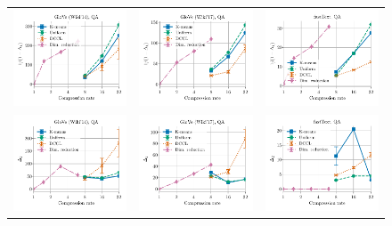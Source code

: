 \begin{figure}
\begin{tabular}{@{\hskip -0.0in}c@{\hskip -0.0in}c@{\hskip -0.0in}c@{\hskip -0.0in}}
		\includegraphics[width=.245\linewidth]{figures/glove400k_synthetics-large-dim_gram-large-dim-delta1-2-trans_vs_compression_linx_stoc.pdf} &
		\includegraphics[width=.245\linewidth]{figures/glove-wiki400k-am_synthetics-large-dim_gram-large-dim-delta1-2-trans_vs_compression_linx_stoc.pdf} &
		\includegraphics[width=.245\linewidth]{figures/fasttext1m_synthetics-large-dim_gram-large-dim-delta1-2-trans_vs_compression_linx_stoc.pdf}	\\
		\includegraphics[width=.245\linewidth]{figures/glove400k_synthetics-large-dim_gram-large-dim-delta2-2_vs_compression_linx_stoc.pdf} &
		\includegraphics[width=.245\linewidth]{figures/glove-wiki400k-am_synthetics-large-dim_gram-large-dim-delta2-2_vs_compression_linx_stoc.pdf} &
		\includegraphics[width=.245\linewidth]{figures/fasttext1m_synthetics-large-dim_gram-large-dim-delta2-2_vs_compression_linx_stoc.pdf}	\\

\end{tabular}
\end{figure}
